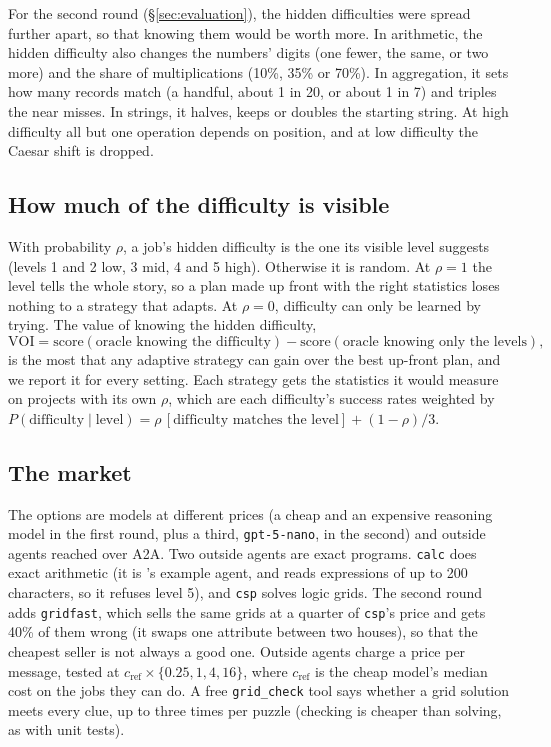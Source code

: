 For the second round (\S\ref{sec:evaluation}), the hidden difficulties were spread further apart, so that knowing them
would be worth more. In arithmetic, the hidden difficulty also changes the numbers' digits (one fewer, the same, or two
more) and the share of multiplications (10\%, 35\% or 70\%). In aggregation, it sets how many records match (a handful,
about 1 in 20, or about 1 in 7) and triples the near misses. In strings, it halves, keeps or doubles the starting
string. At high difficulty all but one operation depends on position, and at low difficulty the Caesar shift is
dropped.

\subsection{How much of the difficulty is visible}
With probability $\rho$, a job's hidden difficulty is the one its visible level suggests (levels 1 and 2 low, 3 mid, 4
and 5 high). Otherwise it is random. At $\rho = 1$ the level tells the whole story, so a plan made up front with the
right statistics loses nothing to a strategy that adapts. At $\rho = 0$, difficulty can only be learned by trying. The
value of knowing the hidden difficulty,
\[
\mathrm{VOI} = \mathrm{score}(\text{oracle knowing the difficulty}) - \mathrm{score}(\text{oracle knowing only the levels}),
\]
is the most that any adaptive strategy can gain over the best up-front plan, and we report it for every setting. Each
strategy gets the statistics it would measure on projects with its own $\rho$, which are each difficulty's success
rates weighted by $P(\text{difficulty} \mid \text{level}) = \rho\,[\text{difficulty matches the level}] + (1 - \rho)/3$.

\subsection{The market}
\label{sec:purse-market}
The options are models at different prices (a cheap and an expensive reasoning model in the first round, plus a third,
\texttt{gpt-5-nano}, in the second) and outside agents reached over A2A. Two outside agents are exact programs.
\texttt{calc} does exact arithmetic (it is \sys{}'s example agent, and reads expressions of up to 200 characters, so it
refuses level 5), and \texttt{csp} solves logic grids. The second round adds \texttt{gridfast}, which sells the same
grids at a quarter of \texttt{csp}'s price and gets 40\% of them wrong (it swaps one attribute between two houses), so
that the cheapest seller is not always a good one. Outside agents charge a price per message, tested at
$c_\mathrm{ref} \times \{0.25, 1, 4, 16\}$, where $c_\mathrm{ref}$ is the cheap model's median cost on the jobs they can
do. A free \texttt{grid\_check} tool says whether a grid solution meets every clue, up to three times per puzzle
(checking is cheaper than solving, as with unit tests).

